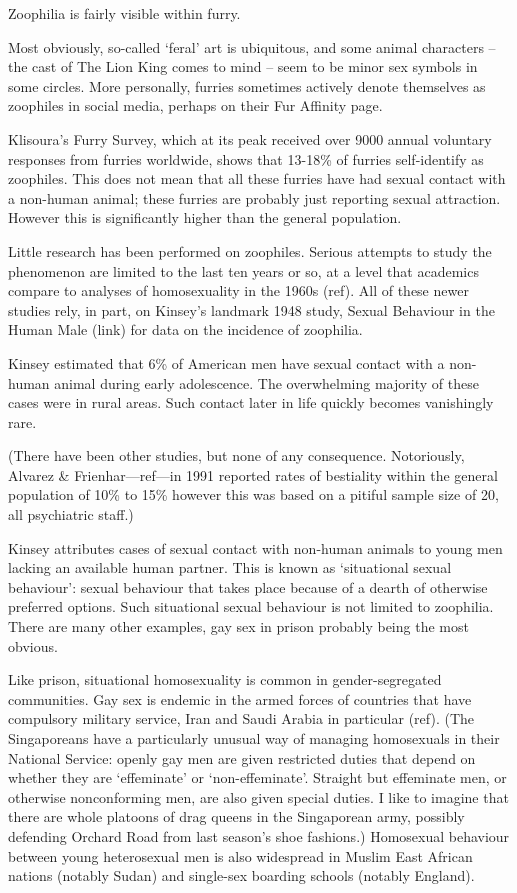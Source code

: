 
Zoophilia is fairly visible within furry.

Most obviously, so-called `feral' art is ubiquitous, and some animal characters -- the cast of The Lion King comes to mind -- seem to be minor sex symbols in some circles. More personally, furries sometimes actively denote themselves as zoophiles in social media, perhaps on their Fur Affinity page.

Klisoura's Furry Survey, which at its peak received over 9000 annual voluntary responses from furries worldwide, shows that 13-18\% of furries self-identify as zoophiles. This does not mean that all these furries have had sexual contact with a non-human animal; these furries are probably just reporting sexual attraction. However this is significantly higher than the general population.

Little research has been performed on zoophiles. Serious attempts to study the phenomenon are limited to the last ten years or so, at a level that academics compare to analyses of homosexuality in the 1960s (ref). All of these newer studies rely, in part, on Kinsey's landmark 1948 study, Sexual Behaviour in the Human Male (link) for data on the incidence of zoophilia.

Kinsey estimated that 6\% of American men have sexual contact with a non-human animal during early adolescence. The overwhelming majority of these cases were in rural areas. Such contact later in life quickly becomes vanishingly rare.

(There have been other studies, but none of any consequence. Notoriously, Alvarez \& Frienhar—ref—in 1991 reported rates of bestiality within the general population of 10\% to 15\% however this was based on a pitiful sample size of 20, all psychiatric staff.)

Kinsey attributes cases of sexual contact with non-human animals to young men lacking an available human partner. This is known as `situational sexual behaviour': sexual behaviour that takes place because of a dearth of otherwise preferred options. Such situational sexual behaviour is not limited to zoophilia. There are many other examples, gay sex in prison probably being the most obvious.

Like prison, situational homosexuality is common in gender-segregated communities. Gay sex is endemic in the armed forces of countries that have compulsory military service, Iran and Saudi Arabia in particular (ref). (The Singaporeans have a particularly unusual way of managing homosexuals in their National Service: openly gay men are given restricted duties that depend on whether they are `effeminate' or `non-effeminate'. Straight but effeminate men, or otherwise nonconforming men, are also given special duties. I like to imagine that there are whole platoons of drag queens in the Singaporean army, possibly defending Orchard Road from last season's shoe fashions.) Homosexual behaviour between young heterosexual men is also widespread in Muslim East African nations (notably Sudan) and single-sex boarding schools (notably England).

